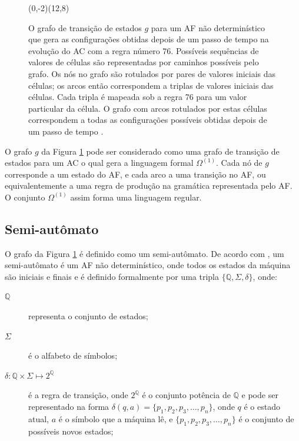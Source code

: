 \documentclass[12pt,a4paper]{article}
\begin{document}
\begin{figure}[htp]
\begin{center}
\begin{VCPicture}{(0,-2)(12,8)}
 
 
 
 
 
 
\end{VCPicture}
\caption{O grafo de transição de estados $g$ para um AF
não determinístico que gera as configurações obtidas depois de um passo
de tempo na evolução do AC com a regra número 76.
Possíveis sequências de valores de células são representadas por
caminhos possíveis pelo grafo. Os nós no grafo são rotulados por pares
de valores iniciais das células; os arcos então correspondem a triplas
de valores iniciais das células. Cada tripla é mapeada sob a regra 76
para um valor particular da célula. O grafo com arcos rotulados por estas
células correspondem a todas as configurações possíveis obtidas depois
de um passo de tempo .}
\label{fig:A1}
\end{center}
\end{figure}

O grafo $g$ da Figura \ref{fig:A1} pode ser considerado como uma grafo
de transição de estados para um AC o qual gera a linguagem
formal $\Omega^{(1)}$. Cada nó de $g$ corresponde a um estado do
AF, e cada arco a uma transição no AF, ou
equivalentemente a uma regra  de produção na gramática representada pelo
AF. O conjunto $\Omega^{(1)}$ assim forma uma linguagem
regular.

\subsection{Semi-autômato}

O grafo da Figura \ref{fig:A1} é definido como um semi-autômato.
De acordo com , um semi-autômato é um AF
não determinístico, onde todos os estados da máquina são iniciais
e finais e é definido formalmente por uma tripla $\{\mathbb{Q},\Sigma,\delta\}$,
onde:

\begin{description}
\item[$\mathbb{Q}$] representa o conjunto de estados;
\item[$\Sigma$] é o alfabeto de símbolos;
\item[$\delta:\mathbb{Q} \times \Sigma \mapsto 2^\mathbb{Q}$] é a regra de transição, onde
$2^\mathbb{Q}$ é o conjunto potência de $\mathbb{Q}$ e pode ser representado na forma
$\delta(q,a) = \{p_1,p_2,p_3,\ldots,p_n\}$, onde $q$ é o estado atual, $a$
é o símbolo que a máquina lê, e $\{p_1,p_2,p_3,\ldots,p_n\}$ é o
conjunto de possíveis novos estados;
\end{description}
\end{document}
